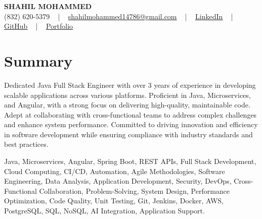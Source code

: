 \documentclass[letterpaper,10pt]{article}
\begin{document}
\begin{center}
    {\fontsize{14pt}{12pt}\selectfont \textbf{\MakeUppercase{Shahil Mohammed}}}\\ \vspace{2pt}
    \fontsize{10pt}{12pt}\selectfont (832) 620-5379 ~ | ~ \href{mailto:shahilmohammed14786@gmail.com}{shahilmohammed14786@gmail.com} ~ | ~  
    \href{https://www.linkedin.com/in/shahil-mohammed-9652931a1/}{\color{blue}\underline{LinkedIn}}  ~ | ~ 
    \href{https://github.com/freakbeast14}{\color{blue}\underline{GitHub}} ~ | ~ 
    \href{https://shahil-mohammed.netlify.app/}{\color{blue}\underline{Portfolio}}
    \vspace{-8pt}
\end{center}

\section{Summary}
\vspace{-2pt}\fontsize{8pt}{9pt}\selectfont
Dedicated Java Full Stack Engineer with over 3 years of experience in developing scalable applications across various platforms. Proficient in Java, Microservices, and Angular, with a strong focus on delivering high-quality, maintainable code. Adept at collaborating with cross-functional teams to address complex challenges and enhance system performance. Committed to driving innovation and efficiency in software development while ensuring compliance with industry standards and best practices.
 \vspace{-5pt}
 
{\fontsize{1pt}{1pt}\selectfont\color{white}
Java, Microservices, Angular, Spring Boot, REST APIs, Full Stack Development, Cloud Computing, CI/CD, Automation, Agile Methodologies, Software Engineering, Data Analysis, Application Development, Security, DevOps, Cross-Functional Collaboration, Problem-Solving, System Design, Performance Optimization, Code Quality, Unit Testing, Git, Jenkins, Docker, AWS, PostgreSQL, SQL, NoSQL, AI Integration, Application Support.
}
\vspace{-8pt}

\vspace{-2pt}
\end{document}
